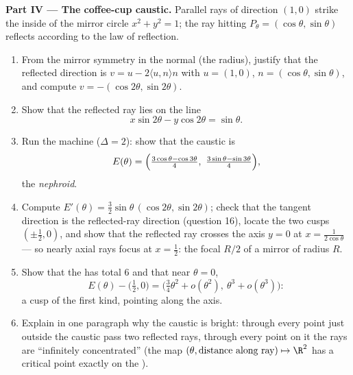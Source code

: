 \begin{problem}
\medskip
\noindent\textbf{Part IV --- The coffee-cup caustic.} Parallel
rays of direction $(1, 0)$ strike the inside of the mirror
circle $x^2 + y^2 = 1$; the ray hitting $P_\theta =
(\cos\theta, \sin\theta)$ reflects according to the law of
reflection.
\begin{enumerate}[resume]
  \item From the mirror symmetry in the normal (the radius),
        justify that the reflected direction is $v = u -
        2\langle u, n\rangle n$ with $u = (1,0)$, $n =
        (\cos\theta, \sin\theta)$, and compute $v =
        -(\cos2\theta, \sin2\theta)$.
  \item Show that the reflected ray lies on the line
        \[
        x\sin 2\theta - y\cos 2\theta = \sin\theta .
        \]
  \item Run the  machine ($\Delta = 2$): show that
        the caustic is
        \[
        E(\theta) = \Bigl(\tfrac{3\cos\theta -
        \cos3\theta}4,\ \tfrac{3\sin\theta -
        \sin3\theta}4\Bigr),
        \]
        the \emph{nephroid}.
  \item Compute $E'(\theta) = \tfrac32\sin\theta\,
        (\cos2\theta, \sin2\theta)$; check that the tangent
        direction is the reflected-ray direction (question
        16), locate the two cusps $(\pm\tfrac12, 0)$, and
        show that the reflected ray crosses the axis $y = 0$
        at $x = \frac1{2\cos\theta}$ --- so nearly axial rays
        focus at $x = \tfrac12$: the focal  $R/2$ of a
        mirror of radius $R$.
  \item Show that the  has total  $6$ and that
        near $\theta = 0$,
        \[
        E(\theta) - \bigl(\tfrac12, 0\bigr) =
        \bigl(\tfrac34\theta^2 + o(\theta^2),\ \theta^3 +
        o(\theta^3)\bigr) :
        \]
        a cusp of the first kind, pointing along the axis.
  \item Explain in one paragraph why the caustic is bright:
        through every point just outside the caustic pass two
        reflected rays, through every point on it the rays
        are ``infinitely concentrated'' (the map $(\theta,
        \text{distance along ray}) \mapsto \R^2$ has a
        critical point exactly on the ).
\end{enumerate}


\end{problem}
